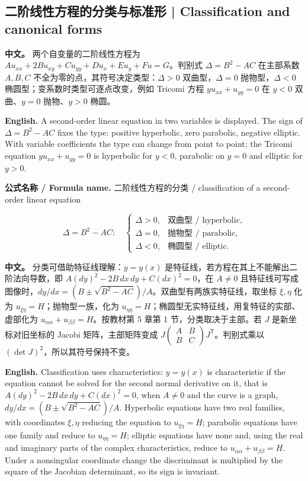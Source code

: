 \documentclass[UTF8,11pt,a4paper]{ctexart}
\newcommand{\FORMULA}[2]{\par\noindent\textbf{公式名称 / Formula name.} #1 / #2\par}
\newcommand{\APS}[2]{\par\noindent\textbf{中文。} #1\par\noindent\textbf{English.} #2\par\smallskip}
\begin{document}
\subsection{二阶线性方程的分类与标准形 | Classification and canonical forms}
\APS{两个自变量的二阶线性方程为 $Au_{xx}+2Bu_{xy}+Cu_{yy}+Du_x+Eu_y+Fu=G$。判别式 $\Delta=B^2-AC$ 在主部系数 $A,B,C$ 不全为零的点，其符号决定类型：$\Delta>0$ 双曲型，$\Delta=0$ 抛物型，$\Delta<0$ 椭圆型；变系数时类型可逐点改变，例如 Tricomi 方程 $yu_{xx}+u_{yy}=0$ 在 $y<0$ 双曲、$y=0$ 抛物、$y>0$ 椭圆。}{A second-order linear equation in two variables is displayed. The sign of $\Delta=B^2-AC$ fixes the type: positive hyperbolic, zero parabolic, negative elliptic. With variable coefficients the type can change from point to point; the Tricomi equation $yu_{xx}+u_{yy}=0$ is hyperbolic for $y<0$, parabolic on $y=0$ and elliptic for $y>0$.}
\FORMULA{二阶线性方程的分类}{classification of a second-order linear equation}
\[
\Delta=B^2-AC:\quad
\begin{cases}
\Delta>0, & \text{双曲型 / hyperbolic},\\
\Delta=0, & \text{抛物型 / parabolic},\\
\Delta<0, & \text{椭圆型 / elliptic}.
\end{cases}
\]
\APS{分类可借助特征线理解：$y=y(x)$ 是特征线，若方程在其上不能解出二阶法向导数，即 $A(dy)^2-2B\,dx\,dy+C(dx)^2=0$，在 $A\ne0$ 且特征线可写成图像时，$dy/dx=(B\pm\sqrt{B^2-AC})/A$。双曲型有两族实特征线，取坐标 $\xi,\eta$ 化为 $u_{\xi\eta}=H$；抛物型一族，化为 $u_{\eta\eta}=H$；椭圆型无实特征线，用复特征的实部、虚部化为 $u_{\alpha\alpha}+u_{\beta\beta}=H$。按教材第 5 章第 1 节，分类取决于主部。若 $J$ 是新坐标对旧坐标的 Jacobi 矩阵，主部矩阵变成 $J\begin{pmatrix}A&B\\B&C\end{pmatrix}J^{\mathsf T}$。判别式乘以 $(\det J)^2$，所以其符号保持不变。}{Classification uses characteristics: $y=y(x)$ is characteristic if the equation cannot be solved for the second normal derivative on it, that is $A(dy)^2-2B\,dx\,dy+C(dx)^2=0$, when $A\ne0$ and the curve is a graph, $dy/dx=(B\pm\sqrt{B^2-AC})/A$. Hyperbolic equations have two real families, with coordinates $\xi,\eta$ reducing the equation to $u_{\xi\eta}=H$; parabolic equations have one family and reduce to $u_{\eta\eta}=H$; elliptic equations have none and, using the real and imaginary parts of the complex characteristics, reduce to $u_{\alpha\alpha}+u_{\beta\beta}=H$. Under a nonsingular coordinate change the discriminant is multiplied by the square of the Jacobian determinant, so its sign is invariant.}
\end{document}
